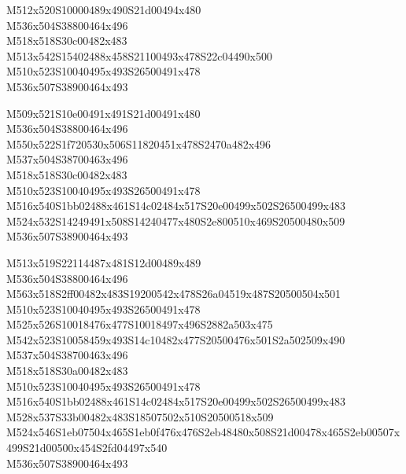 \documentclass{article}
\begin{document}
\begin{multicols}{5}
\begin{center}

M512x520S10000489x490S21d00494x480 %
\\M536x504S38800464x496 %
\\M518x518S30c00482x483 %
\\M513x542S15402488x458S21100493x478S22c04490x500 %
\\M510x523S10040495x493S26500491x478 %
\\M536x507S38900464x493 %
\vfil
\columnbreak

M509x521S10e00491x491S21d00491x480 %
\\M536x504S38800464x496 %
\\M550x522S1f720530x506S11820451x478S2470a482x496 %
\\M537x504S38700463x496 %
\\M518x518S30c00482x483 %
\\M510x523S10040495x493S26500491x478 %
\\M516x540S1bb02488x461S14c02484x517S20e00499x502S26500499x483 %
\\M524x532S14249491x508S14240477x480S2e800510x469S20500480x509 %
\\M536x507S38900464x493 %
\vfil
\columnbreak

M513x519S22114487x481S12d00489x489 %
\\M536x504S38800464x496 %
\\M563x518S2ff00482x483S19200542x478S26a04519x487S20500504x501 %
\\M510x523S10040495x493S26500491x478 %
\\M525x526S10018476x477S10018497x496S2882a503x475 %
\\M542x523S10058459x493S14c10482x477S20500476x501S2a502509x490 %
\\M537x504S38700463x496 %
\\M518x518S30a00482x483 %
\\M510x523S10040495x493S26500491x478 %
\\M516x540S1bb02488x461S14c02484x517S20e00499x502S26500499x483 %
\\M528x537S33b00482x483S18507502x510S20500518x509 %
\\M524x546S1eb07504x465S1eb0f476x476S2eb48480x508S21d00478x465S2eb00507x499S21d00500x454S2fd04497x540 %
\\M536x507S38900464x493 %
\vfil
\columnbreak


\end{center}
\end{multicols}
\end{document}
